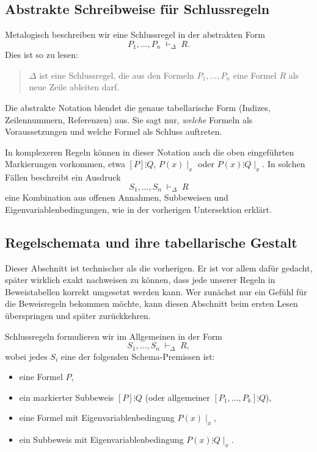 \documentclass[main.tex]{subfiles}
\begin{document}
\subsection{Abstrakte Schreibweise für Schlussregeln}

Metalogisch beschreiben wir eine Schlussregel in der abstrakten Form
\[
  P_1,\dots,P_n \;\vdash_\Delta\; R.
\]
Dies ist so zu lesen:
\begin{quote}
  \(\Delta\) ist eine Schlussregel, die aus den Formeln
  \(P_1,\dots,P_n\) eine Formel \(R\) als neue Zeile ableiten darf.
\end{quote}
Die abstrakte Notation blendet die genaue tabellarische Form (Indizes,
Zeilennummern, Referenzen) aus. Sie sagt nur, \emph{welche} Formeln als
Voraussetzungen und welche Formel als Schluss auftreten.

In komplexeren Regeln können in dieser Notation auch die oben
eingeführten Markierungen vorkommen, etwa
\([P]\vdots Q\), \(P(x)\mid_x\) oder \(P(x)\vdots Q\mid_x\). In solchen
Fällen beschreibt ein Ausdruck
\[
  S_1,\dots,S_n \;\vdash_\Delta\; R
\]
eine Kombination aus offenen Annahmen, Subbeweisen und
Eigenvariablenbedingungen, wie in der vorherigen Untersektion erklärt.

\subsection{Regelschemata und ihre tabellarische Gestalt}

\begin{remark}
Dieser Abschnitt ist technischer als die vorherigen. Er ist vor
allem dafür gedacht, später wirklich exakt nachweisen zu können,
dass jede unserer Regeln in Beweistabellen korrekt umgesetzt
werden kann. Wer zunächst nur ein Gefühl für die Beweisregeln
bekommen möchte, kann diesen Abschnitt beim ersten Lesen
überspringen und später zurückkehren.
\end{remark}

Schlussregeln formulieren wir im Allgemeinen in der Form
\[
  S_1,\dots,S_n \;\vdash_\Delta\; R,
\]
wobei jedes \(S_i\) eine der folgenden Schema-Premissen ist:
\begin{itemize}
  \item eine Formel \(P\),
  \item ein markierter Subbeweis \([P]\vdots Q\) (oder allgemeiner
        \([P_1,\dots,P_k]\vdots Q\)),
  \item eine Formel mit Eigenvariablenbedingung \(P(x)\mid_x\),
  \item ein Subbeweis mit Eigenvariablenbedingung \(P(x)\vdots Q\mid_x\).
\end{itemize}
\end{document}
